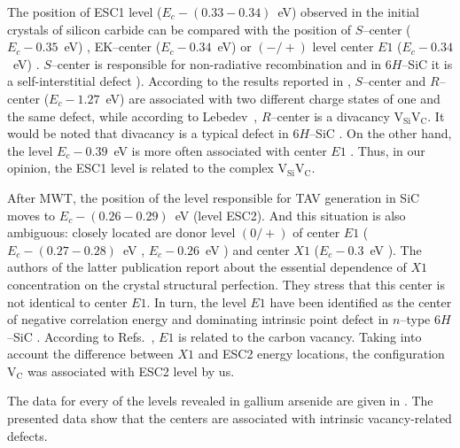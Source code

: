 \documentclass[10pt]{iopart}
\begin{document}
The position of ESC1 level ($E_c-(0.33-0.34)$~eV) observed in the initial crystals of silicon carbide can be compared
with the position of $S$--center ($E_c-0.35$~eV) \cite{Lebed1999En,Anikin1991:2En,Anikin1991:3En},
EK–center ($E_c-0.34$~eV) \cite{Kuznets1997En}
or $(-/+)$ level center $E1$ ($E_c-0.34$~eV) \cite{Lebed1999En}.
$S$--center is responsible for non-radiative recombination and
in 6$H$–SiC it is a self-interstitial defect \cite{Lebed1999En}).
According to the results reported in \cite{Anikin1991:2En,Anikin1991:3En},
$S$--center and $R$--center ($E_c-1.27$~eV) are associated with two different charge states
of one and the same defect,
while according to Lebedev~\etal \cite{Lebedev2000En},
$R$--center is a divacancy $\mathrm{V}_\mathrm{Si}\mathrm{V}_\mathrm{C}$.
It would be noted that  divacancy is a typical defect in 6$H$--SiC \cite{SiCBaran,SiCDavid}.
On the other hand, the level $E_c-0.39$~eV is more often associated with center $E1$ \cite{SiCWei,SiCKoizumi}.
Thus, in our opinion, the ESC1 level is related to the  complex $\mathrm{V}_\mathrm{Si}\mathrm{V}_\mathrm{C}$.

After MWT, the position of the level responsible for TAV generation in SiC moves
to $E_c-(0.26-0.29)$~eV (level ESC2).
And this situation is also ambiguous: closely located are donor level $(0/+)$ of
center $E1$ ($E_c-(0.27-0.28)$~eV \cite{Hemmingsson},
$E_c-0.26$~eV \cite{SiCWei,SiCKoizumi})
and center $X1$ ($E_c-0.3$~eV \cite{Lebedev2001En}).
The authors of the latter publication report about the essential dependence of $X1$ concentration on the crystal structural perfection.
They stress that this center is not identical to center $E1$.
In turn, the level $E1$ have been identified as the center of negative
correlation energy \cite{Lebedev2001En,SiCWei}
and dominating intrinsic point defect in $n$--type 6$H$--SiC \cite{SiCSasaki}.
According to Refs.~\cite{SiCSasaki,SiCWei}, $E1$ is related to the carbon vacancy.
Taking into account the difference between $X1$ and ESC2 energy locations,
the configuration $\mathrm{V}_\mathrm{C}$ was associated with ESC2 level by us.


The data for every of the levels revealed in gallium arsenide are given in .
The presented data show that the centers are associated with intrinsic vacancy-related defects.
\end{document}
